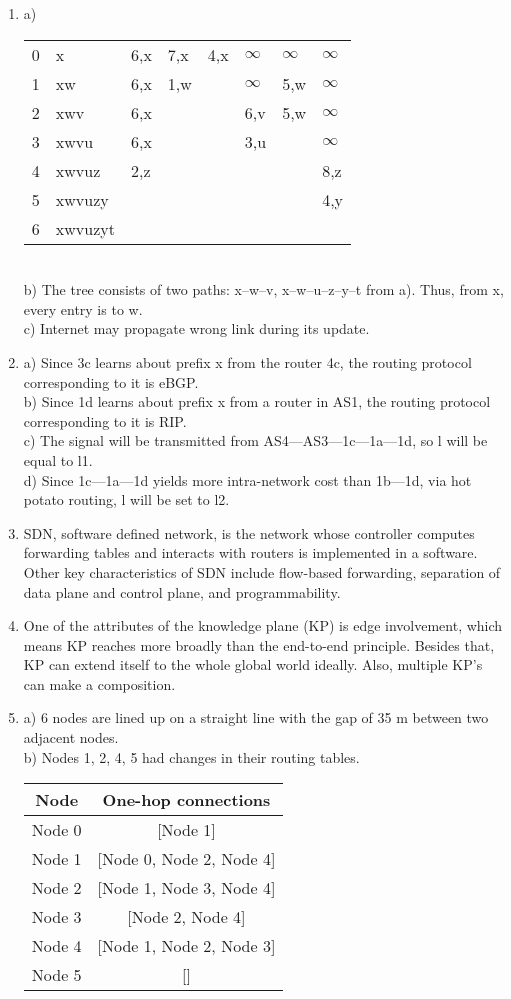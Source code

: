 \documentclass{homework}
\begin{document}
{\begin{enumerate}[label={\arabic*)}]
    \item a) \begin{tabular}{l|l|l|l|l|l|l|l}
      0 & x & 6,x & 7,x & 4,x & $\infty$ & $\infty$ & $\infty$ \\
      1 & xw & 6,x & 1,w & & $\infty$ & 5,w & $\infty$ \\
      2 & xwv & 6,x & & & 6,v & 5,w & $\infty$ \\
      3 & xwvu & 6,x & & & 3,u & & $\infty$ \\
      4 & xwvuz & 2,z & & & & & 8,z \\
      5 & xwvuzy & & & & & & 4,y \\
      6 & xwvuzyt & & & & & & \\
    \end{tabular}\\
    b) The tree consists of two paths: x--w--v, x--w--u--z--y--t from a). Thus, from x, every entry is to w.\\
    c) Internet may propagate wrong link during its update.
    \item a) Since 3c learns about prefix x from the router 4c, the routing protocol corresponding to it is eBGP. \\
    b) Since 1d learns about prefix x from a router in AS1, the routing protocol corresponding to it is RIP. \\
    c) The signal will be transmitted from AS4---AS3---1c---1a---1d, so l will be equal to l1. \\
    d) Since 1c---1a---1d yields more intra-network cost than 1b---1d, via hot potato routing, l will be set to l2.
    \item SDN, software defined network, is the network whose controller computes forwarding tables and interacts with routers is implemented in a software. Other key characteristics of SDN include flow-based forwarding, separation of data plane and control plane, and programmability. 
    \item One of the attributes of the knowledge plane (KP) is edge involvement, which means KP reaches more broadly than the end-to-end principle. Besides that, KP can extend itself to the whole global world ideally. Also, multiple KP's can make a composition.
    \item a) 6 nodes are lined up on a straight line with the gap of 35 m between two adjacent nodes. \\
    b) Nodes 1, 2, 4, 5 had changes in their routing tables.

    \begin{tabular}{c|c}
    Node & One-hop connections \\ \hline
    Node 0 & [Node 1] \\ 
    Node 1 & [Node 0, Node 2, Node 4]\\ 
    Node 2 & [Node 1, Node 3, Node 4]\\ 
    Node 3 & [Node 2, Node 4]\\ 
    Node 4 & [Node 1, Node 2, Node 3]\\ 
    Node 5 & []\\ 
    \end{tabular}


\end{enumerate}}
\end{document}
